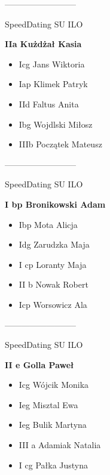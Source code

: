 \documentclass[a4paper,10pt]{article}
\begin{document}
\begin{multicols}{3}
\begin{minipage}[l]{\textwidth}
\begin{itemize}
    \end{itemize}



\end{minipage}



\begin{minipage}[l]{\textwidth}
--------------------------

  \footnotesize{SpeedDating SU ILO}

  \bfseries{IIa Kużdżał Kasia}

  \begin{itemize}
    \item Icg Jans Wiktoria
    \item Iap Klimek Patryk
    \item IId Faltus Anita
    \item Ibg Wojdlski Miłosz
    \item IIIb Początek Mateusz

    \end{itemize}



\end{minipage}



\begin{minipage}[l]{\textwidth}
--------------------------

  \footnotesize{SpeedDating SU ILO}

  \bfseries{I bp Bronikowski Adam}

  \begin{itemize}
    \item Ibp Mota Alicja
    \item Idg Zarudzka Maja
    \item I cp Loranty Maja
    \item II b Nowak Robert
    \item Icp Worsowicz Ala

    \end{itemize}



\end{minipage}



\begin{minipage}[l]{\textwidth}
--------------------------

  \footnotesize{SpeedDating SU ILO}

  \bfseries{II e Golla Paweł}

  \begin{itemize}
    \item Icg Wójcik Monika
    \item Ieg Misztal Ewa
    \item Ieg Bulik Martyna
    \item III a Adamiak Natalia
    \item I cg Pałka Justyna


\end{itemize}
\end{minipage}
\end{multicols}
\end{document}

